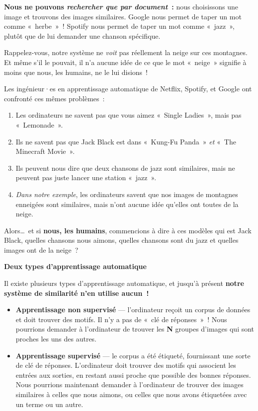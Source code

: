 \documentclass[12pt,a4paper]{article}
\begin{document}
\begin{keypointbox}
  \textbf{Nous ne pouvons \emph{rechercher que par document}~:} nous choisissons une image et trouvons des images similaires. Google nous permet de taper un mot comme «~herbe~»~! Spotify nous permet de taper un mot comme «~jazz~», plutôt que de lui demander une chanson spécifique.
\end{keypointbox}

Rappelez-vous, notre système ne \emph{voit} pas réellement la neige sur ces montagnes. Et même s'il le pouvait, il n'a aucune idée de ce que le mot «~neige~» signifie à moins que nous, les humains, ne le lui disions~!

\begin{thinkbox}
  Les ingénieur·es en apprentissage automatique de Netflix, Spotify, et Google ont confronté ces mêmes problèmes~:
  \begin{enumerate}
    \item Les ordinateurs ne savent pas que vous aimez «~Single Ladies~», mais pas «~Lemonade~».
    \item Ils ne savent pas que Jack Black est dans «~Kung-Fu Panda~» \emph{et} «~The Minecraft Movie~».
    \item Ils peuvent nous dire que deux chansons de jazz sont similaires, mais ne peuvent pas juste lancer une station «~jazz~».
    \item \emph{Dans notre exemple}, les ordinateurs savent que nos images de montagnes enneigées sont similaires, mais n'ont aucune idée qu'elles ont toutes de la neige.
  \end{enumerate}

  Alors…~et si \textbf{nous, les humains}, commencions à dire à ces modèles qui est Jack Black, quelles chansons nous aimons, quelles chansons sont du jazz et quelles images ont de la neige~?
\end{thinkbox}

\begin{keypointbox}
  \textbf{Deux types d'apprentissage automatique}

  Il existe plusieurs types d'apprentissage automatique, et jusqu'à présent \textbf{notre système de similarité n'en utilise aucun~!}

  \begin{itemize}
    \item \textbf{Apprentissage non supervisé} — l'ordinateur reçoit un corpus de données et doit trouver des motifs. Il n'y a pas de «~clé de réponses~»~! Nous pourrions demander à l'ordinateur de trouver les \textbf{N} groupes d'images qui sont proches les uns des autres.
    \item \textbf{Apprentissage supervisé} — le corpus a été étiqueté, fournissant une sorte de clé de réponses. L'ordinateur doit trouver des motifs qui associent les entrées aux sorties, en restant aussi proche que possible des bonnes réponses. Nous pourrions maintenant demander à l'ordinateur de trouver des images similaires à celles que nous aimons, ou celles que nous avons étiquetées avec un terme ou un autre.
  \end{itemize}
\end{keypointbox}
\end{document}
